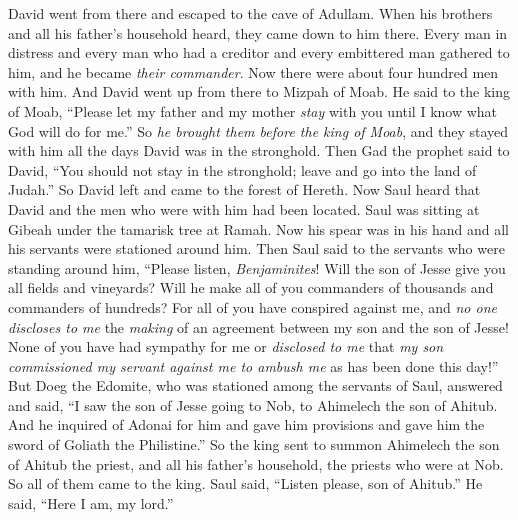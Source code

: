 \begin{biblechapter} %
 David went from there and escaped to the cave of Adullam. When his brothers and all his father’s household heard, they came down to him there.
\verse Every man in distress and every man who had a creditor and every embittered man gathered to him, and he became \textit{their commander}. Now there were about four hundred men with him.
\verse And David went up from there to Mizpah of Moab. He said to the king of Moab, “Please let my father and my mother \textit{stay} with you until I know what God will do for me.”
\verse So \textit{he brought them before the king of Moab}, and they stayed with him all the days David was in the stronghold.
\verse Then Gad the prophet said to David, “You should not stay in the stronghold; leave and go into the land of Judah.” So David left and came to the forest of Hereth.
\verse Now Saul heard that David and the men who were with him had been located. Saul was sitting at Gibeah under the tamarisk tree at Ramah. Now his spear was in his hand and all his servants were stationed around him.
\verse Then Saul said to the servants who were standing around him, “Please listen, \textit{Benjaminites}! Will the son of Jesse give you all fields and vineyards? Will he make all of you commanders of thousands and commanders of hundreds?
\verse For all of you have conspired against me, and \textit{no one discloses to me} the \textit{making} of an agreement between my son and the son of Jesse! None of you have had sympathy for me or \textit{disclosed to me} that \textit{my son commissioned my servant against me to ambush me} as has been done this day!”
\verse But Doeg the Edomite, who was stationed among the servants of Saul, answered and said, “I saw the son of Jesse going to Nob, to Ahimelech the son of Ahitub.
\verse And he inquired of Adonai for him and gave him provisions and gave him the sword of Goliath the Philistine.”
\verse So the king sent to summon Ahimelech the son of Ahitub the priest, and all his father’s household, the priests who were at Nob. So all of them came to the king.
\verse Saul said, “Listen please, son of Ahitub.” He said, “Here I am, my lord.”

\end{biblechapter}
